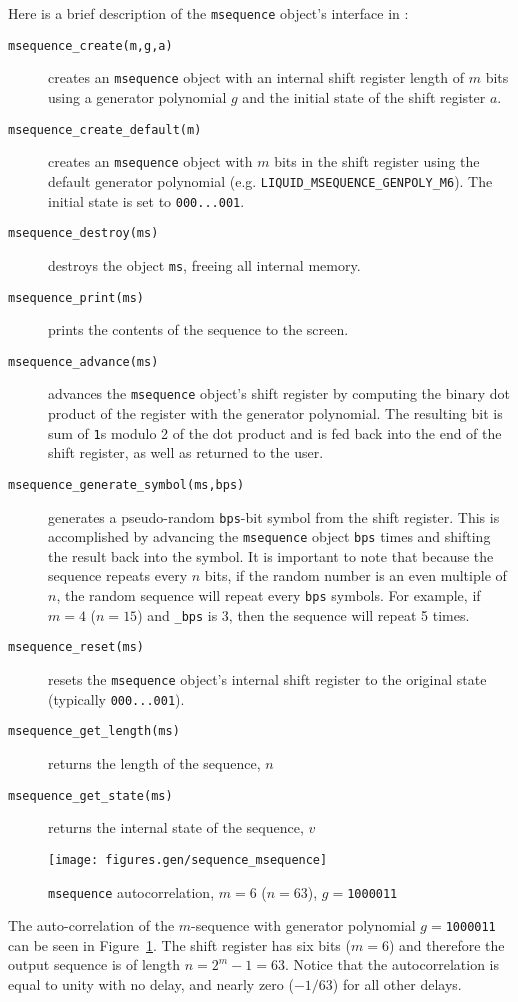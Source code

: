 Here is a brief description of the {\tt msequence} object's interface in
\liquid:
%
\begin{description}
\item[{\tt msequence\_create(m,g,a)}]
    creates an {\tt msequence} object with an internal shift register
    length of $m$ bits using a generator polynomial $g$ and the initial
    state of the shift register $a$.
\item[{\tt msequence\_create\_default(m)}]
    creates an {\tt msequence} object with $m$ bits in the shift
    register using the default generator polynomial
    (e.g. {\tt LIQUID\_MSEQUENCE\_GENPOLY\_M6}).
    The initial state is set to {\tt 000...001}.
\item[{\tt msequence\_destroy(ms)}]
    destroys the object {\tt ms}, freeing all internal memory.
\item[{\tt msequence\_print(ms)}]
    prints the contents of the sequence to the screen.
\item[{\tt msequence\_advance(ms)}]
    advances the {\tt msequence} object's shift register by computing the
    binary dot product of the register with the generator polynomial.
    The resulting bit is sum of {\tt 1}s modulo 2 of the dot product and is
    fed back into the end of the shift register, as well as returned to the
    user.
\item[{\tt msequence\_generate\_symbol(ms,bps)}]
    generates a pseudo-random {\tt bps}-bit symbol from the shift register.
    This is accomplished by advancing the {\tt msequence} object {\tt bps}
    times and shifting the result back into the symbol.
    It is important to note that because the sequence repeats every $n$ bits,
    if the random number is an even multiple of $n$, the random sequence will
    repeat every {\tt bps} symbols.
    For example, if $m=4$ ($n=15$) and {\tt \_bps} is 3, then the sequence
    will repeat 5 times.
\item[{\tt msequence\_reset(ms)}]
    resets the {\tt msequence} object's internal shift register to the
    original state (typically {\tt 000...001}).
\item[{\tt msequence\_get\_length(ms)}]
    returns the length of the sequence, $n$
\item[{\tt msequence\_get\_state(ms)}]
    returns the internal state of the sequence, $v$
\end{description}
%
\begin{figure}
\centering
  \texttt{[image: figures.gen/sequence\_msequence]}
\caption{{\tt msequence} autocorrelation, $m=6$ ($n=63$), $g=${\tt 1000011}}
\label{fig:module:sequence:msequence}
\end{figure}
%
%
%
The auto-correlation of the $m$-sequence with generator polynomial
$g=${\tt 1000011}
can be seen in Figure~\ref{fig:module:sequence:msequence}.
The shift register has six bits ($m=6$) and therefore the output sequence is
of length $n=2^m-1=63$.
Notice that the autocorrelation is equal to unity with no delay, and nearly
zero ($-1/63$) for all other delays.




